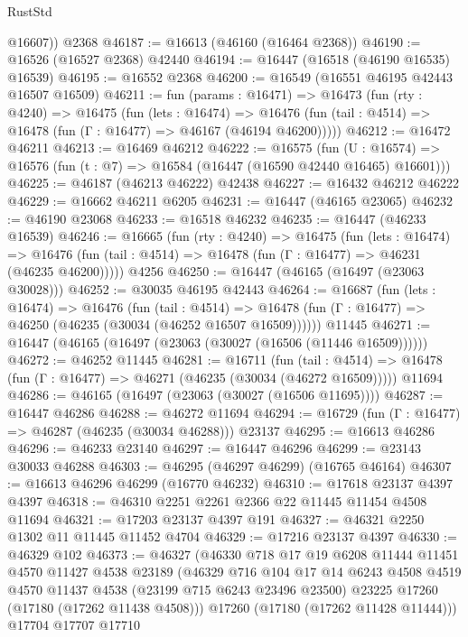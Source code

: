 \begin{lexlean}{RustStd}
\begin{coremodule}
{\begin{coremodule}
{{{{{{{{{{{{{{{{{{{{{{{{{{{{{{{{{{{{{{{{{{{{{{{{{{{{{{{        @16607))
    @2368
@46187 := @16613 (@46160 (@16464 @2368))
@46190 := @16526 (@16527 @2368) @42440
@46194 := @16447 (@16518 (@46190 @16535) @16539)
@46195 := @16552 @2368
@46200 := @16549 (@16551 @46195 @42443 @16507 @16509)
@46211 := fun (params : @16471) =>
  @16473
    (fun (rty : @4240) =>
    @16475
      (fun (lets : @16474) =>
      @16476 (fun (tail : @4514) => @16478 (fun (Γ : @16477) => @46167 (@46194 @46200)))))
@46212 := @16472 @46211
@46213 := @16469 @46212
@46222 := @16575
    (fun (U : @16574) => @16576 (fun (t : @7) => @16584 (@16447 (@16590 @42440 @16465) @16601)))
@46225 := @46187 (@46213 @46222) @42438
@46227 := @16432 @46212 @46222
@46229 := @16662 @46211 @6205
@46231 := @16447 (@46165 @23065)
@46232 := @46190 @23068
@46233 := @16518 @46232
@46235 := @16447 (@46233 @16539)
@46246 := @16665
    (fun (rty : @4240) =>
    @16475
      (fun (lets : @16474) =>
      @16476 (fun (tail : @4514) => @16478 (fun (Γ : @16477) => @46231 (@46235 @46200)))))
    @4256
@46250 := @16447 (@46165 (@16497 (@23063 @30028)))
@46252 := @30035 @46195 @42443
@46264 := @16687
    (fun (lets : @16474) =>
    @16476
      (fun (tail : @4514) =>
      @16478 (fun (Γ : @16477) => @46250 (@46235 (@30034 (@46252 @16507 @16509))))))
    @11445
@46271 := @16447 (@46165 (@16497 (@23063 (@30027 (@16506 (@11446 @16509))))))
@46272 := @46252 @11445
@46281 := @16711
    (fun (tail : @4514) => @16478 (fun (Γ : @16477) => @46271 (@46235 (@30034 (@46272 @16509)))))
    @11694
@46286 := @46165 (@16497 (@23063 (@30027 (@16506 @11695))))
@46287 := @16447 @46286
@46288 := @46272 @11694
@46294 := @16729 (fun (Γ : @16477) => @46287 (@46235 (@30034 @46288))) @23137
@46295 := @16613 @46286
@46296 := @46233 @23140
@46297 := @16447 @46296
@46299 := @23143 @30033 @46288
@46303 := @46295 (@46297 @46299) (@16765 @46164)
@46307 := @16613 @46296 @46299 (@16770 @46232)
@46310 := @17618 @23137 @4397 @4397
@46318 := @46310 @2251 @2261 @2366 @22 @11445 @11454 @4508 @11694
@46321 := @17203 @23137 @4397 @191
@46327 := @46321 @2250 @1302 @11 @11445 @11452 @4704
@46329 := @17216 @23137 @4397
@46330 := @46329 @102
@46373 := @46327
    (@46330
      @718
      @17
      @19
      @6208
      @11444
      @11451
      @4570
      @11427
      @4538
      @23189
      (@46329
        @716
        @104
        @17
        @14
        @6243
        @4508
        @4519
        @4570
        @11437
        @4538
        (@23199 @715 @6243 @23496 @23500)
        @23225
        @17260
        (@17180 (@17262 @11438 @4508)))
      @17260
      (@17180 (@17262 @11428 @11444)))
    @17704
    @17707
    @17710
}}}}}}}}}}}}}}}}}}}}}}}}}}}}}}}}}}}}}}}}}}}}}}}}}}}}}}}
\end{coremodule}}
\end{coremodule}
\end{lexlean}
